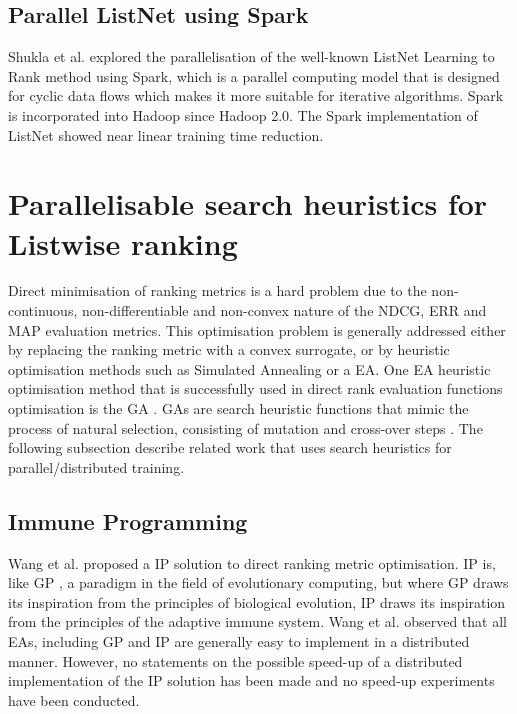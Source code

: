 \subsection{Parallel ListNet using Spark}
Shukla et al. \cite{Shukla2012} explored the parallelisation of the well-known ListNet Learning to Rank method using Spark, which is a parallel computing model that is designed for cyclic data flows which makes it more suitable for iterative algorithms. Spark is incorporated into Hadoop since Hadoop 2.0. The Spark implementation of ListNet showed near linear training time reduction.\\

\section{Parallelisable search heuristics for Listwise ranking}
Direct minimisation of ranking metrics is a hard problem due to the non-continuous, non-differentiable and non-convex nature of the \ac{NDCG}, \ac{ERR} and \ac{MAP} evaluation metrics. This optimisation problem is generally addressed either by replacing the ranking metric with a convex surrogate, or by heuristic optimisation methods such as Simulated Annealing or a \ac{EA}. One \ac{EA} heuristic optimisation method that is successfully used in direct rank evaluation functions optimisation is the \ac{GA} \cite{Yeh2007}. \ac{GA}s are search heuristic functions that mimic the process of natural selection, consisting of mutation and cross-over steps \cite{Holland1995}. The following subsection describe related work that uses search heuristics for parallel/distributed training.
\subsection{Immune Programming}
Wang et al. \cite{Wang2009b} proposed a \ac{IP} solution to direct ranking metric optimisation. \ac{IP} \cite{Musilek2006} is, like \ac{GP} \cite{Koza1992}, a paradigm in the field of evolutionary computing, but where \ac{GP} draws its inspiration from the principles of biological evolution, \ac{IP} draws its inspiration from the principles of the adaptive immune system. Wang et al. \cite{Wang2009b} observed that all \ac{EA}s, including \ac{GP} and \ac{IP} are generally easy to implement in a distributed manner. However, no statements on the possible speed-up of a distributed implementation of the \ac{IP} solution has been made and no speed-up experiments have been conducted.
